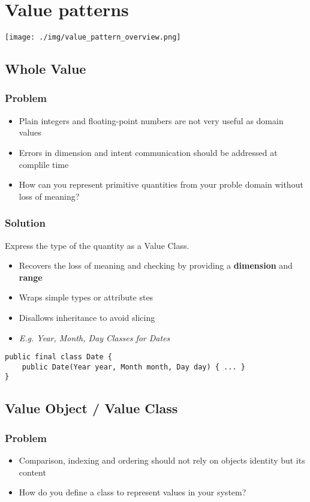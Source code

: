\section{Value patterns}
\texttt{[image: ./img/value\_pattern\_overview.png]}

\subsection{Whole Value}
\subsubsection{Problem}
\begin{itemize}
    \item Plain integers and floating-point numbers are not very useful as domain values
    \item Errors in dimension and intent communication should be addressed at complile time
    \item How can you represent primitive quantities from your proble domain without loss of meaning?
\end{itemize}
\subsubsection{Solution}
Express the type of the quantity as a Value Class.\\ 
\begin{itemize}
    \item Recovers the loss of meaning and checking by providing a \textbf{dimension} and \textbf{range}
    \item Wraps simple types or attribute stes
    \item Disallows inheritance to avoid slicing
    \item \textit{E.g. Year, Month, Day Classes for Dates}
\end{itemize}
\begin{lstlisting}
public final class Date {
    public Date(Year year, Month month, Day day) { ... }
}
\end{lstlisting}

\subsection{Value Object / Value Class}
\subsubsection{Problem}
\begin{itemize}
    \item Comparison, indexing and ordering should not rely on objects identity but its content
    \item How do you define a class to represent values in your system?
\end{itemize}
